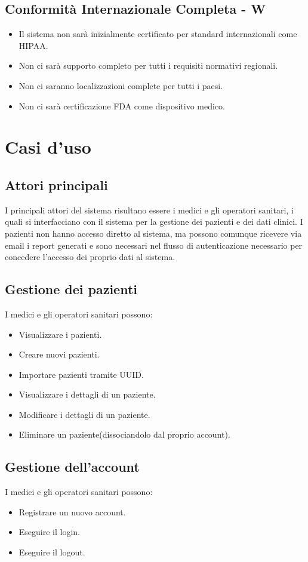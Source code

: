 \documentclass[12pt,a4paper,oneside]{report}
\begin{document}
\subsection{Conformità Internazionale Completa - W}

\begin{itemize}
    \item Il sistema non sarà inizialmente certificato per standard internazionali come HIPAA.
    \item Non ci sarà supporto completo per tutti i requisiti normativi regionali.
    \item Non ci saranno localizzazioni complete per tutti i paesi.
    \item Non ci sarà certificazione FDA come dispositivo medico.

\end{itemize}

\section{Casi d'uso}
\subsection{Attori principali}
I principali attori del sistema risultano essere i medici e gli operatori sanitari, i quali si interfacciano con il sistema per la gestione dei pazienti e dei dati clinici.
I pazienti non hanno accesso diretto al sistema, ma possono comunque ricevere via email i report generati e sono necessari nel flusso di autenticazione necessario per concedere l'accesso dei proprio dati al sistema.
\subsection{Gestione dei pazienti}
I medici e gli operatori sanitari possono:
\begin{itemize}
    \item Visualizzare i pazienti.
    \item Creare nuovi pazienti.
    \item Importare pazienti tramite UUID.
    \item Visualizzare i dettagli di un paziente.
    \item Modificare i dettagli di un paziente.
    \item Eliminare un paziente(dissociandolo dal proprio account).
\end{itemize}
\subsection{Gestione dell'account}
I medici e gli operatori sanitari possono:
\begin{itemize}
    \item Registrare un nuovo account.
    \item Eseguire il login.
    \item Eseguire il logout.
\end{itemize}
\end{document}
